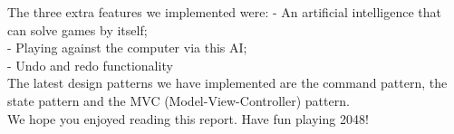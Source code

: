 \documentclass[a4paper,11pt,report]{scrartcl}
\begin{document}
The three extra features we implemented were:
- An artificial intelligence that can solve games by itself;\\
- Playing against the computer via this AI;\\
- Undo and redo functionality\\

The latest design patterns we have implemented are the command pattern, the
state pattern and the MVC (Model-View-Controller) pattern.\\

We hope you enjoyed reading this report. Have fun playing 2048!\\
\end{document}
